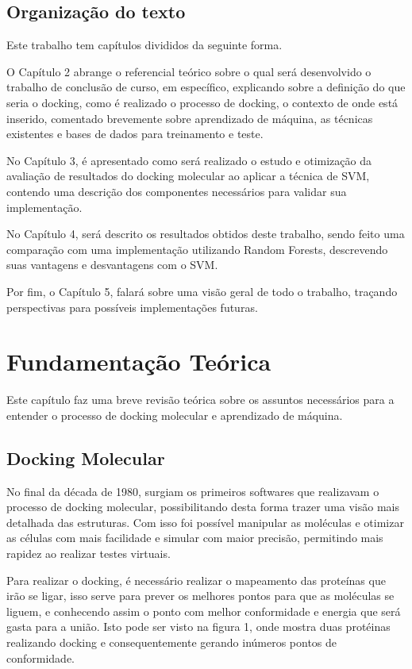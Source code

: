 \documentclass[tcc, capa]{texucpel}
\begin{document}
\section{Organização do texto}
Este trabalho tem capítulos divididos da seguinte forma.

O Capítulo 2 abrange o referencial teórico sobre o qual será desenvolvido o trabalho de conclusão de curso, em específico, explicando sobre a definição do que seria o docking, como é realizado o processo de docking, o contexto de onde está inserido, comentado brevemente sobre aprendizado de máquina, as técnicas existentes e bases de dados para treinamento e teste.

No Capítulo 3, é apresentado como será realizado o estudo e otimização da avaliação de resultados do docking molecular ao aplicar a técnica de SVM, contendo uma descrição dos componentes necessários para validar sua implementação.

No Capítulo 4, será descrito os resultados obtidos deste trabalho, sendo feito uma comparação com uma implementação utilizando Random Forests, descrevendo suas vantagens e desvantagens com o SVM.

Por fim, o Capítulo 5, falará sobre uma visão geral de todo o trabalho, traçando perspectivas para possíveis implementações futuras.

\chapter{Fundamentação Teórica}
Este capítulo faz uma breve revisão teórica sobre os assuntos necessários para a entender o processo de docking molecular  e aprendizado de máquina.

\section{Docking Molecular}
No final da década de 1980, surgiam os primeiros softwares que realizavam o processo de docking molecular, possibilitando desta forma trazer uma visão mais detalhada das estruturas. Com isso foi possível manipular as moléculas e otimizar as células com mais facilidade e simular com maior precisão, permitindo mais rapidez ao realizar testes virtuais.

Para realizar o docking, é necessário realizar o mapeamento das proteínas que irão se ligar, isso serve para prever os melhores pontos para que as moléculas se liguem, e conhecendo assim o ponto com melhor conformidade e energia que será gasta para a união. Isto pode ser visto na figura 1, onde mostra duas protéinas realizando  docking e consequentemente gerando inúmeros pontos de conformidade.
\end{document}
